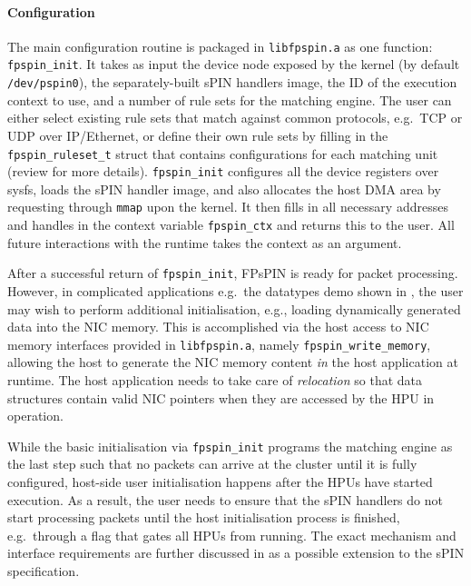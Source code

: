 \paragraph{Configuration} The main configuration routine is packaged in \texttt{libfpspin.a} as one function: \texttt{fpspin\_init}.  It takes as input the device node exposed by the kernel (by default \texttt{/dev/pspin0}), the separately-built sPIN handlers image, the ID of the execution context to use, and a number of rule sets for the matching engine.  The user can either select existing rule sets that match against common protocols, e.g.\ TCP or UDP over IP/Ethernet, or define their own rule sets by filling in the \texttt{fpspin\_\-ruleset\_\-t} struct that contains configurations for each matching unit (review  for more details).  \texttt{fpspin\_init} configures all the device registers over sysfs, loads the sPIN handler image, and also allocates the host DMA area by requesting through \texttt{mmap} upon the kernel.  It then fills in all necessary addresses and handles in the context variable \texttt{fpspin\_\-ctx} and returns this to the user.  All future interactions with the runtime takes the context as an argument.

After a successful return of \texttt{fpspin\_\-init}, FPsPIN is ready for packet processing.  However, in complicated applications e.g.\ the datatypes demo shown in ,  the user may wish to perform additional initialisation, e.g., loading dynamically generated data into the NIC memory.  This is accomplished via the host access to NIC memory interfaces provided in \texttt{libfpspin.a}, namely \texttt{fpspin\_write\_memory}, allowing the host to generate the NIC memory content \emph{in} the host application at runtime.  The host application needs to take care of \emph{relocation} so that data structures contain valid NIC pointers when they are accessed by the HPU in operation.

While the basic initialisation via \texttt{fpspin\_\-init} programs the matching engine as the last step such that no packets can arrive at the cluster until it is fully configured, host-side user initialisation happens after the HPUs have started execution.  As a result, the user needs to ensure that the sPIN handlers do not start processing packets until the host initialisation process is finished, e.g.\ through a flag that gates all HPUs from running.  The exact mechanism and interface requirements are further discussed in  as a possible extension to the sPIN specification.

